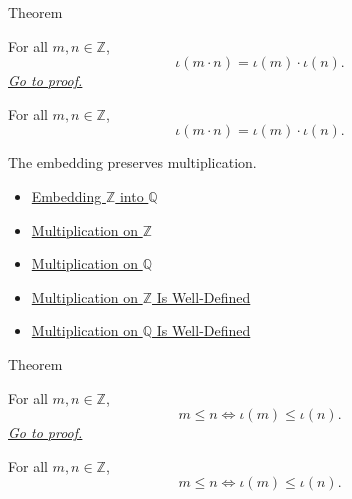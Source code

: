\begin{theorembox}{Theorem}
\begin{theorem}
\label{thm:embedding-z-into-q-preserves-multiplication}
For all $m,n\in\mathbb{Z}$,
\[
\iota(m\cdot n)=\iota(m)\cdot\iota(n).
\]
\hyperref[prf:embedding-z-into-q-preserves-multiplication]{\textit{Go to proof.}}
\end{theorem}
\end{theorembox}

\begin{remark*}
For all $m,n\in\mathbb{Z}$,
\[
\iota(m\cdot n)=\iota(m)\cdot\iota(n).
\]
\end{remark*}

\begin{remark*}[Interpretation]
The embedding preserves multiplication.
\end{remark*}

\begin{dependencies}
\begin{itemize}
  \item \hyperref[def:rational-chapter-embedding-z-into-q]{Embedding $\mathbb{Z}$ into $\mathbb{Q}$}
  \item \hyperref[def:multiplication-on-z-classes]{Multiplication on $\mathbb{Z}$}
  \item \hyperref[def:multiplication-on-q-classes]{Multiplication on $\mathbb{Q}$}
  \item \hyperref[thm:multiplication-on-z-well-defined]{Multiplication 
on $\mathbb{Z}$ Is Well-Defined}
  \item \hyperref[thm:multiplication-on-q-well-defined]{Multiplication on $\mathbb{Q}$ Is Well-Defined}
\end{itemize}
\end{dependencies}

\begin{theorembox}{Theorem}
\begin{theorem}
\label{thm:embedding-z-into-q-preserves-order}
For all $m,n\in\mathbb{Z}$,
\[
m\le n
\Longleftrightarrow
\iota(m)\le\iota(n).
\]
\hyperref[prf:embedding-z-into-q-preserves-order]{\textit{Go to proof.}}
\end{theorem}
\end{theorembox}

\begin{remark*}
For all $m,n\in\mathbb{Z}$,
\[
m\le n
\Longleftrightarrow
\iota(m)\le\iota(n).
\]
\end{remark*}

